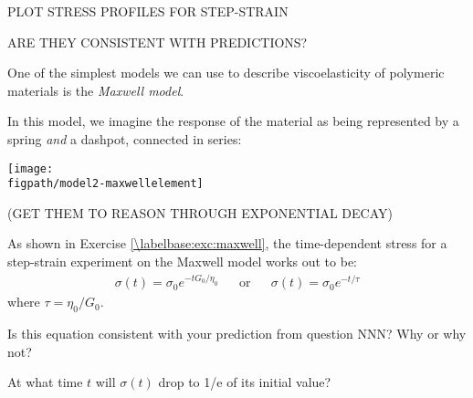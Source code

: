 \begin{activity}
\begin{infobox}
\end{infobox}

\begin{ctqs}
	\question PLOT STRESS PROFILES FOR STEP-STRAIN
	
	\question ARE THEY CONSISTENT WITH PREDICTIONS?
\end{ctqs}
	

\begin{model}
\label{\labelbase:mdl:maxwell}

	One of the simplest models we can use to describe viscoelasticity of polymeric materials is the \emph{Maxwell model}.
	
	In this model, we imagine the response of the material as being represented by a spring \emph{and} a dashpot, connected in series:
	
	\centerline{\texttt{[image: \\figpath/model2-maxwellelement]}}
	
\end{model}

	
\begin{ctqs}
	\question (GET THEM TO REASON THROUGH EXPONENTIAL DECAY)
	
					\begin{solution}[2.5in]
					\end{solution}
					
\end{ctqs}

\begin{infobox}
	As shown in Exercise \ref{\labelbase:exc:maxwell}, the time-dependent stress for a step-strain experiment on the Maxwell model works out to be:
	\begin{align*}
		\sigma(t) = \sigma_0 e^{-t G_0/\eta_0}  && \text{or} && \sigma(t) = \sigma_0 e^{-t /\tau}
	\end{align*}
	where $\tau = \eta_0/G_0$.
\end{infobox}

\begin{ctqs}
	
	\question Is this equation consistent with your prediction from question  NNN?  Why or why not?
	
					\begin{solution}[1.5in]
					\end{solution}
		
	\question At what time $t$ will $\sigma(t)$ drop to 1/e of its initial value?
	
					\begin{solution}[1.5in]
					\end{solution}
		

\end{ctqs}
\end{activity}
